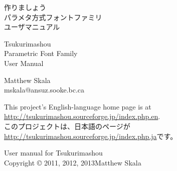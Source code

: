 \documentclass[14pt]{extarticle}
\begin{document}
\pagestyle{plain}\thispagestyle{empty}


\kaku
\begin{center}\LARGE

\vspace*{\fill}


{\Huge 作りましょう~\TsukurimashouVWide}\\
{\huge パラメタ方式フォントファミリ\\
ユーザマニュアル}

\vspace*{0.75in}

{\Huge Tsukurimashou~\TsukurimashouVersion}\\
{\huge Parametric Font Family\\
User Manual}

\vspace*{1.5in}

Matthew Skala\\
mskala@ansuz.sooke.bc.ca\\
\TsukurimashouRDWide\qquad\TsukurimashouReleaseDate

\vspace*{\fill}

\end{center}
\clearpage


\vspace*{\fill}


This project's English-language home page is at\\
\hspace*{1em}\url{http://tsukurimashou.sourceforge.jp/index.php.en}.\\
このプロジェクトは、日本語のページが\\
\hspace*{1em}\url{http://tsukurimashou.sourceforge.jp/index.php.ja}です。

\vspace*{1in}

User manual for Tsukurimashou\\
Copyright © 2011, 2012, 2013\quad Matthew Skala
\end{document}

